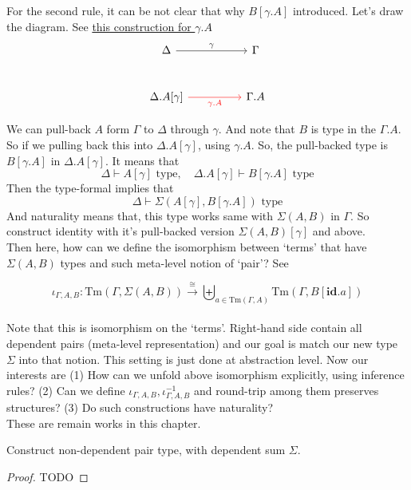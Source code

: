 \documentclass[12pt, a4paper, openany, twoside]{book}
\theoremstyle{definition}
\theoremstyle{remark}
\theoremstyle{plain}
\numberwithin{equation}{section}
\begin{document}
For the second rule, it can be not clear that why $B[\gamma.A]$ introduced. Let's draw the diagram. 
See \hyperlink{gamma.A}{this construction for $\gamma.A$}
\[
\begin{tikzcd}[column sep=huge, row sep=large]
    \Delta \arrow[r, "\gamma"] & \Gamma   \\
    \Delta.A[\gamma] \arrow[r, "\gamma.A"', red] & \Gamma.A
\end{tikzcd}
\]

We can pull-back $A$ form $\Gamma$ to $\Delta$ through $\gamma$. And note that $B$ is type in the $\Gamma.A$. So if we pulling back this into $\Delta.A[\gamma]$, 
using $\gamma.A$. So, the pull-backed type is $B[\gamma.A]$ in $\Delta.A[\gamma]$. It means that 
\[\Delta \vdash A[\gamma] \text{ type}, \quad \Delta.A[\gamma] \vdash B[\gamma.A] \text{ type}\]
Then the type-formal implies that 
\[\Delta \vdash \Sigma(A[\gamma], B[\gamma.A]) \text{ type}\]
And naturality means that, this type works same with $\Sigma(A, B)$ in $\Gamma$. So construct identity with 
it's pull-backed version $\Sigma(A, B)[\gamma]$ and above. 
\\

Then here, how can we define the isomorphism between \lq terms' that have $\Sigma(A,B)$ types and such meta-level notion of \lq pair'? See 

\[\iota_{\Gamma, A, B} : \text{Tm}(\Gamma, \Sigma(A,B)) \xrightarrow{\cong} \biguplus_{a \in \text{Tm}(\Gamma, A)}\text{Tm}(\Gamma, B[\mathbf{id}.a])\]
\\
Note that this is isomorphism on the \lq terms'. Right-hand side contain all dependent pairs (meta-level representation) and 
our goal is match our new type $\Sigma$ into that notion. This setting is just done at abstraction level. Now 
our interests are (1) How can we unfold above isomorphism explicitly, using inference rules? 
(2) Can we define $\iota_{\Gamma, A, B}, \iota_{\Gamma, A, B}^{-1}$ and round-trip among them 
preserves structures? (3) Do such constructions have naturality? \\

These are remain works in this chapter. 

\begin{tcolorbox}[colback=yellow!10!white,colframe=brown!75!black,title=Exercise 2.16.]
Construct non-dependent pair type, with dependent sum $\Sigma$. 

\begin{proof}
    TODO
\end{proof}

\end{tcolorbox}
\end{document}
